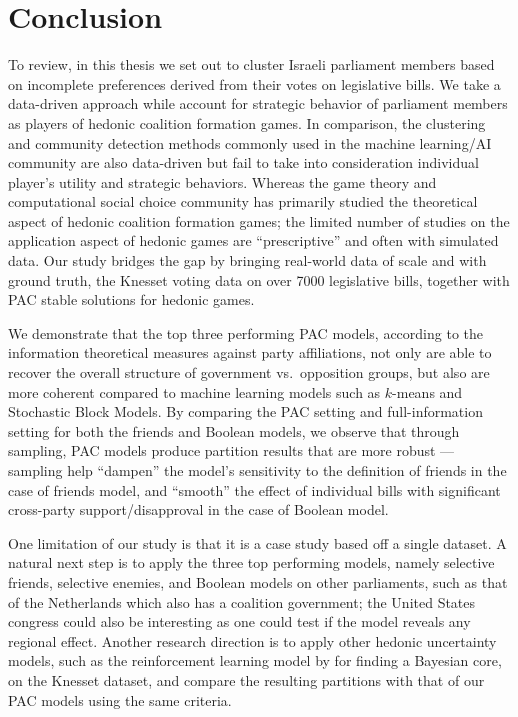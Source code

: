 \chapter{Conclusion}
\label{ch:concl}

To review, in this thesis we set out to cluster Israeli parliament members
based on incomplete preferences derived from their votes on legislative bills.
We take a data-driven approach while account for strategic behavior of
parliament members as players of hedonic coalition formation games.
In comparison, the clustering and community detection methods commonly used in
the machine learning/AI community are also data-driven but fail to take into
consideration individual player's utility and strategic behaviors.
Whereas the game theory and computational social choice community has primarily
studied the theoretical aspect of hedonic coalition formation games;
the limited number of studies on the application aspect of hedonic games are
``prescriptive'' and often with simulated data.
Our study bridges the gap by bringing real-world data of scale and with ground
truth, the Knesset voting data on over 7000 legislative bills, together with
PAC stable solutions for hedonic games.

We demonstrate that the top three performing PAC models, according to the
information theoretical measures against party affiliations, not only are able
to recover the overall structure of government vs.\ opposition groups, but also
are more coherent compared to machine learning models such as $k$-means and
Stochastic Block Models.
By comparing the PAC setting and full-information setting for both the friends
and Boolean models, we observe that through sampling, PAC models produce
partition results that are more robust --- sampling help ``dampen'' the
model's sensitivity to the definition of friends in the case of friends model,
and ``smooth'' the effect of individual bills with significant cross-party
support/disapproval in the case of Boolean model.

One limitation of our study is that it is a case study based off a single
dataset.
A natural next step is to apply the three top performing models, namely
selective friends, selective enemies, and Boolean models on other parliaments,
such as that of the Netherlands which also has a coalition government;
the United States congress could also be interesting as one could test if the
model reveals any regional effect.
Another research direction is to apply other hedonic uncertainty models, such
as the reinforcement learning model by  for
finding a Bayesian core, on the Knesset dataset, and compare the resulting
partitions with that of our PAC models using the same criteria.
